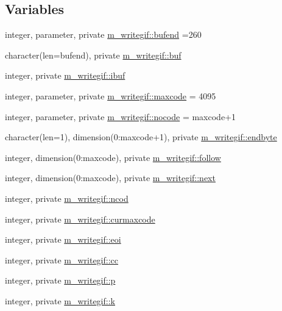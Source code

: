 \subsection*{Variables}
\begin{DoxyCompactItemize}
\item 
integer, parameter, private \mbox{\hyperlink{namespacem__writegif_accdaeeac4357a3dc3dead0ba36e7efd4}{m\+\_\+writegif\+::bufend}} =260
\item 
character(len=bufend), private \mbox{\hyperlink{namespacem__writegif_aa50fc715675e43931ce58f557bf8eb02}{m\+\_\+writegif\+::buf}}
\item 
integer, private \mbox{\hyperlink{namespacem__writegif_a51ee343cdcbf2cd11f1b3740651077eb}{m\+\_\+writegif\+::ibuf}}
\item 
integer, parameter, private \mbox{\hyperlink{namespacem__writegif_ac55f9abf33971ad396b2ae59b288b0bb}{m\+\_\+writegif\+::maxcode}} = 4095
\item 
integer, parameter, private \mbox{\hyperlink{namespacem__writegif_a39141257b89b2cea89b4db4e0a372ffa}{m\+\_\+writegif\+::nocode}} = maxcode+1
\item 
character(len=1), dimension(0\+:maxcode+1), private \mbox{\hyperlink{namespacem__writegif_a43cdcf79f632247eaebb73fc3a7ff25f}{m\+\_\+writegif\+::endbyte}}
\item 
integer, dimension(0\+:maxcode), private \mbox{\hyperlink{namespacem__writegif_aea2ce887598c0e5d80adb90558230c32}{m\+\_\+writegif\+::follow}}
\item 
integer, dimension(0\+:maxcode), private \mbox{\hyperlink{namespacem__writegif_a592346fdf478d7727c143cd25ece2a96}{m\+\_\+writegif\+::next}}
\item 
integer, private \mbox{\hyperlink{namespacem__writegif_aac26e9673fe5e79908a6ff576a298986}{m\+\_\+writegif\+::ncod}}
\item 
integer, private \mbox{\hyperlink{namespacem__writegif_a634657dd81148fd56f39232d7ceda8b5}{m\+\_\+writegif\+::curmaxcode}}
\item 
integer, private \mbox{\hyperlink{namespacem__writegif_a4f0ce85ba2c32d98d9c88801be25cd1f}{m\+\_\+writegif\+::eoi}}
\item 
integer, private \mbox{\hyperlink{namespacem__writegif_a4dc9a91a4e7fde14eff0bab58278e61b}{m\+\_\+writegif\+::cc}}
\item 
integer, private \mbox{\hyperlink{namespacem__writegif_a34d3a64b1381a281909da380d922d770}{m\+\_\+writegif\+::p}}
\item 
integer, private \mbox{\hyperlink{namespacem__writegif_a29211b5bf371e3be08c3047bc80d3e91}{m\+\_\+writegif\+::k}}

\end{DoxyCompactItemize}
